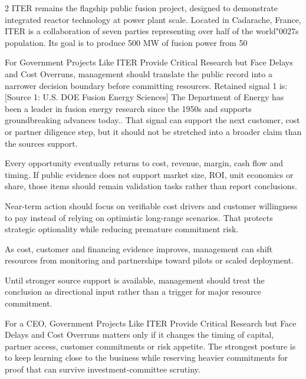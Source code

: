 \documentclass[10pt,a4paper]{article}
\newcommand{\BOApos}{{\BOQuoteFont\char"0027}}
\begin{document}
\begin{multicols}{2}
{\small ITER remains the flagship public fusion project, designed to demonstrate integrated reactor technology at power plant scale. Located in Cadarache, France, ITER is a collaboration of seven parties representing over half of the world\BOApos{}s population. Its goal is to produce 500 MW of fusion power from 50}\par
{\small For Government Projects Like ITER Provide Critical Research but Face Delays and Cost Overruns, management should translate the public record into a narrower decision boundary before committing resources. Retained signal 1 is: [Source 1: U.S. DOE Fusion Energy Sciences] The Department of Energy has been a leader in fusion energy research since the 1950s and supports groundbreaking advances today.. That signal can support the next customer, cost or partner diligence step, but it should not be stretched into a broader claim than the sources support.}\par
{\small Every opportunity eventually returns to cost, revenue, margin, cash flow and timing. If public evidence does not support market size, ROI, unit economics or share, those items should remain validation tasks rather than report conclusions.}\par
{\small Near-term action should focus on verifiable cost drivers and customer willingness to pay instead of relying on optimistic long-range scenarios. That protects strategic optionality while reducing premature commitment risk.}\par
{\small As cost, customer and financing evidence improves, management can shift resources from monitoring and partnerships toward pilots or scaled deployment.}\par
{\small Until stronger source support is available, management should treat the conclusion as directional input rather than a trigger for major resource commitment.}\par
{\small For a CEO, Government Projects Like ITER Provide Critical Research but Face Delays and Cost Overruns matters only if it changes the timing of capital, partner access, customer commitments or risk appetite. The strongest posture is to keep learning close to the business while reserving heavier commitments for proof that can survive investment-committee scrutiny.}\par
\end{multicols}
\label{chap:3:end}
\end{document}
